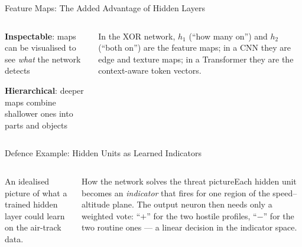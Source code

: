 \documentclass[aspectratio=169,10pt]{beamer}
\begin{document}
\begin{frame}{Feature Maps: The Added Advantage of Hidden Layers}
\begin{columns}[T]
\begin{rbox}
\begin{tl}
\item \textbf{Inspectable}: maps can be visualised to see \emph{what} the network detects
\item \textbf{Hierarchical}: deeper maps combine shallower ones into parts and objects
\end{tl}\end{rbox}
\begin{ibox}\scriptsize In the XOR network, $h_1$ (``how many on'') and $h_2$ (``both on'') are the feature maps; in a CNN they are edge and texture maps; in a Transformer they are the context-aware token vectors.\end{ibox}
\end{columns}
\end{frame}

\begin{frame}{Defence Example: Hidden Units as Learned Indicators}
\begin{columns}[T]
\scriptsize An idealised picture of what a trained hidden layer could learn on the air-track data.
\begin{cbox}{How the network solves the threat picture}\scriptsize Each hidden unit becomes an \emph{indicator} that fires for one region of the speed--altitude plane. The output neuron then needs only a weighted vote: ``$+$'' for the two hostile profiles, ``$-$'' for the two routine ones --- a linear decision in the indicator space.\end{cbox}

\end{columns}
\end{frame}
\end{document}
